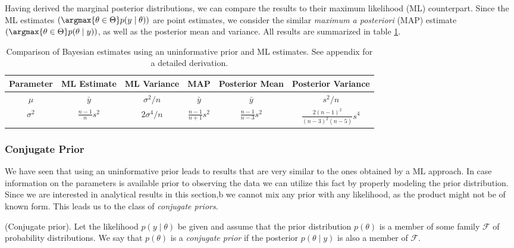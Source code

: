 Having derived the marginal posterior distributions, we can compare the results to their maximum likelihood (ML) counterpart.
Since the ML estimates $\left(\argmax{\theta \in \Theta}p(y \mid \theta)\right)$ are point estimates, we consider the similar \emph{maximum a posteriori} (MAP) estimate $\left(\argmax{\theta \in \Theta} p(\theta \mid y)\right)$, as well as the posterior mean and variance. All results are summarized in table \ref{tab:comp_uniform_bay_ml}.

\begin{table}[ht]
\centering
\def\arraystretch{1.3}
{\small
 \begin{tabular}{c | c c c c c}
 Parameter & ML Estimate & ML Variance & MAP & Posterior Mean & Posterior Variance\\[0.5ex]
 \hline
 $\mu$ & $\bar{y}$ & $\sigma^2/n$ & $\bar{y}$ & $\bar{y}$ & $s^2 / n$\\
 $\sigma^2$ & $\frac{n-1}{n} s^2$ & $2 \sigma^4 /n$ & $\frac{n-1}{n+1} s^2$ & $\frac{n-1}{n-3} s^2$ & $\frac{2 (n-1)^2}{(n-3)^2 (n-5)} s^4$\\
 \end{tabular}
 }
\caption{\small {Comparison of Bayesian estimates using an uninformative prior and ML estimates. See appendix for a detailed derivation.}}
\label{tab:comp_uniform_bay_ml}
\end{table}


\subsubsection*{Conjugate Prior}
We have seen that using an uninformative prior leads to results that are very similar to the ones obtained by a ML approach.
In case information on the parameters is available prior to observing the data we can utilize this fact by properly modeling the prior distribution.
Since we are interested in analytical results in this section,b we cannot mix any prior with any likelihood, as the product might not be of known form.
This leads us to the class of \emph{conjugate priors}.

\begin{definition}{(Conjugate prior).}
Let the likelihood $p(y \mid \theta)$ be given and assume that the prior distribution $p(\theta)$ is a member of some family $\mathcal{F}$ of probability distributions.
We say that $p(\theta)$ is a \emph{conjugate prior} if the posterior $p(\theta \mid y)$ is also a member of $\mathcal{F}$.
\end{definition}

